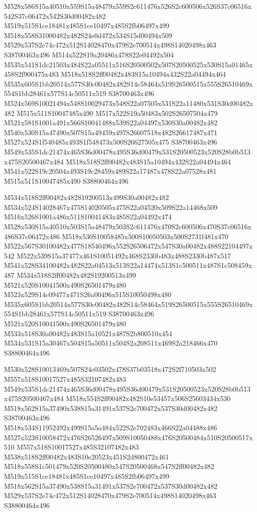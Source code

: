 \documentclass{article}
\begin{document}
\begin{multicols}{2}
M528x586S15a40510x559S15a48479x559S2c611476x526S2c600506x526S37c06516x542S37c06472x542S30d00482x482 M519x515S1ce18481x485S1ce10497x485S2fb06497x499 M518x558S31000482x482S24e0d472x534S15d00494x509 M529x537S2e74c472x512S14028470x479S2e700514x498S14020498x463 S38700463x496 M514x522S19a20486x478S22e04492x504 M535x541S1dc21503x484S22a05511x516S20500502x507S20500525x530S15a01465x458S2f900475x483 M518x518S2ff00482x483S15a10494x432S22a04494x464 M535x605S1bb20514x577S30c00482x482S14c58464x519S26500515x555S26510469x554S1bb28461x577S14c50511x519 S38700463x496 M524x569S10021494x548S10029473x548S22a07505x531S22a11480x531S30d00482x482 M515x511S10047485x490 M517x522S19a50483x502S26507504x479 M521x581S1001a491x566S10041488x539S22a04497x530S30a00482x482 M540x530S15a47490x507S15a49459x497S26607518x482S26617487x471 M527x524S1f540485x493S1f548473x500S26627505x475 S38700463x496 M549x535S1dc21474x465S36d00478x495S36d00479x531S20500523x520S28b0b513x475S20500467x484 M518x518S2ff00482x483S15a10494x432S22a04494x464 M541x522S19c20504x493S19c28459x489S22a17487x478S22a07528x481 M515x511S10047485x490 S38800464x496

M534x518S2ff00482x482S19200513x499S30a00482x482 M534x524S14028467x475S14020505x475S22a04520x509S22a14468x509 M516x526S1001a486x511S10041483x485S22a04492x474 M528x530S15a40510x503S15a48479x503S2c611476x470S2c600506x470S37c06516x486S37c06472x486 M518x530S10058485x500S10050503x500S2731f481x470 M522x567S30100482x477S18540496x552S26506472x547S30a00482x488S22104497x542 M522x539S15a37477x461S10051492x468S2330b483x488S2330b487x517 M541x528S34100482x482S22a04513x513S22a14474x513S1c500511x487S1c508459x487 M534x518S2ff00482x482S19200513x499 M521x520S10041500x490S26501479x480 M523x529S14c09477x471S26a00496x515S10050498x480 M535x605S1bb20514x577S30c00482x482S14c58464x519S26500515x555S26510469x554S1bb28461x577S14c50511x519 S38700463x496 M521x520S10041500x490S26501479x480 M533x518S30a00482x483S15a10521x487S2b800510x454 M534x531S15a30467x504S15a50511x504S2a208511x469S2a218466x470 S38800464x496

M530x528S10013469x507S24e03502x478S37b03518x472S2f710503x502 M557x518S10017527x485S32107482x483 M549x535S1dc21474x465S36d00478x495S36d00479x531S20500523x520S28b0b513x475S20500467x484 M518x554S2ff00482x482S10e53457x506S25603434x530 M518x562S15a37490x538S15a31491x537S2e700472x537S30d00482x482 S38700463x496 M518x534S11952492x499S15a5a484x522S2e702483x466S22a04488x486 M527x523S10058472x476S26526497x509S10050488x476S20500484x510S20500517x510 M557x518S10017527x485S32107482x483 M538x518S2ff00482x483S10e20523x451S2d800472x461 M518x558S1c501479x520S20500480x547S20500468x547S2ff00482x482 M519x515S1ce18481x485S1ce10497x485S2fb06497x499 M518x562S15a37490x538S15a31491x537S2e700472x537S30d00482x482 M529x537S2e74c472x512S14028470x479S2e700514x498S14020498x463 S38800464x496


\end{multicols}
\end{document}
